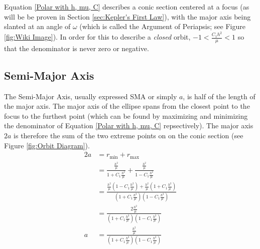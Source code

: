\documentclass{article}
\begin{document}
Equation \eqref{Polar with h, mu, C} describes a conic section centered at a focus (as will be be proven in Section \ref{sec:Kepler's First Law}), with the major axis being slanted at an angle of $\omega$ (which is called the Argument of Periapsis; see Figure \ref{fig:Wiki Image}). In order for this to describe a \textit{closed} orbit, $-1<\frac{C_1h^2}{\mu}<1$ so that the denominator is never zero or negative.




\subsection{Semi-Major Axis}

The Semi-Major Axis, usually expressed SMA or simply $a$, is half of the length of the major axis. The major axis of the ellipse spans from the closest point to the focus to the furthest point (which can be found by maximizing and minimizing the denominator of Equation \eqref{Polar with h, mu, C} repsectively). The major axis $2a$ is therefore the sum of the two extreme points on on the conic section (see Figure \ref{fig:Orbit Diagram}).
\begin{align*}
    2a & =r_\text{min}+r_\text{max}                                                                                                        \\
       & =\frac{\frac{h^2}{\mu}}{1+C_1\frac{h^2}{\mu}}+\frac{\frac{h^2}{\mu}}{1-C_1\frac{h^2}{\mu}}                                        \\
       & =\frac{\frac{h^2}{\mu}(1-C_1\frac{h^2}{\mu})+\frac{h^2}{\mu}(1+C_1\frac{h^2}{\mu})}{(1+C_1\frac{h^2}{\mu})(1-C_1\frac{h^2}{\mu})} \\
       & =\frac{2\frac{h^2}{\mu}}{(1+C_1\frac{h^2}{\mu})(1-C_1\frac{h^2}{\mu})}                                                            \\
    a  & =\frac{\frac{h^2}{\mu}}{(1+C_1\frac{h^2}{\mu})(1-C_1\frac{h^2}{\mu})}
\end{align*}
\end{document}
